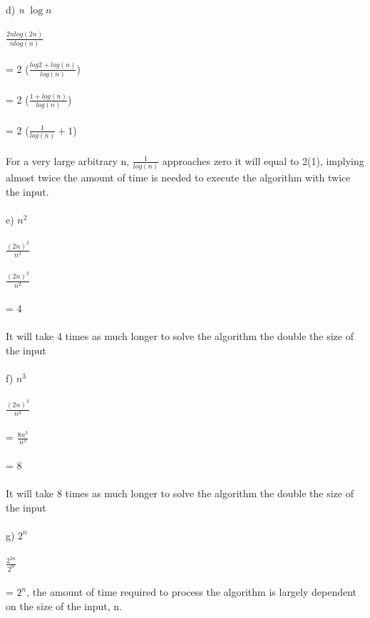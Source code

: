 \documentclass{article}
\begin{document}
{d) \emph{n} $\log{n}$ \\ \\ 
$\frac{2nlog(2n)}{n log (n)}$\\ \\
= 2 ($\frac{log2 + log(n)}{log (n)}$)\\ \\
= 2 ($\frac{1 + log(n)}{log (n)}$)\\ \\
= 2 ($\frac{1}{log (n)} + 1$)\\ \\
For a very large arbitrary n, $\frac{1}{log (n)}$ approaches zero it will equal to 2(1), implying almost twice the amount of time is needed to execute the algorithm with twice the input. \\\\
e) $n^2$ \\ \\ 
$\frac{(2n)^2}{n^2}$ \\\\
$\frac{(2n)^2}{n^2}$  \\\\
= 4 \\\\
It will take 4 times as much longer to solve the algorithm the double the size of the input  \\\\
f)  $n^3$ \\ \\ 
$\frac{(2n)^3}{n^3}$ \\\\
= $\frac{8n^3}{n^3}$ \\\\
= 8 \\\\
It will take 8 times as much longer to solve the algorithm the double the size of the input \\\\
g) $2^n$ \\ \\ 
$\frac{2^{2n}}{2^n}$ \\\\
= $2^n$, the amount of time required to process the algorithm is largely dependent on the size of the input, n. 
\newpage
}
\end{document}
